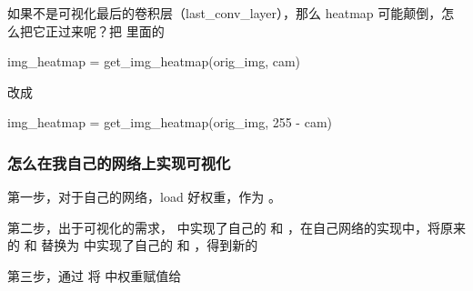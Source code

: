 如果不是可视化最后的卷积层（last\_conv\_layer），那么 heatmap 可能颠倒，怎么把它正过来呢？把  里面的
\begin{python}
img_heatmap = get_img_heatmap(orig_img, cam)
\end{python}
改成
\begin{python}
img_heatmap = get_img_heatmap(orig_img, 255 - cam)
\end{python}


\subsubsection{怎么在我自己的网络上实现可视化}

第一步，对于自己的网络，load 好权重，作为 。

第二步，出于可视化的需求， 中实现了自己的  和 ，在自己网络的实现中，将原来的  和  替换为  中实现了自己的  和 ，得到新的 

第三步，通过  将  中权重赋值给 





